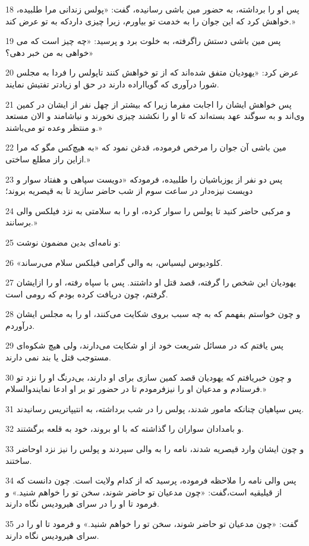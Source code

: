 \par 18 پس او را برداشته، به حضور مین باشی رسانیده، گفت: «پولس زندانی مرا طلبیده، خواهش کرد که این جوان را به خدمت تو بیاورم، زیرا چیزی داردکه به تو عرض کند.»
\par 19 پس مین باشی دستش راگرفته، به خلوت برد و پرسید: «چه چیز است که می خواهی به من خبر دهی؟»
\par 20 عرض کرد: «یهودیان متفق شده‌اند که از تو خواهش کنند تاپولس را فردا به مجلس شورا درآوری که گویااراده دارند در حق او زیادتر تفتیش نمایند.
\par 21 پس خواهش ایشان را اجابت مفرما زیرا که بیشتر از چهل نفر از ایشان در کمین وی‌اند و به سوگند عهد بسته‌اند که تا او را نکشند چیزی نخورند و نیاشامند و الان مستعد و منتظر وعده تو می‌باشند.»
\par 22 مین باشی آن جوان را مرخص فرموده، قدغن نمود که «به هیچ‌کس مگو که مرا ازاین راز مطلع ساختی.»
\par 23 پس دو نفر از یوزباشیان را طلبیده، فرمودکه «دویست سپاهی و هفتاد سوار و دویست نیزه‌دار در ساعت سوم از شب حاضر سازید تا به قیصریه بروند؛
\par 24 و مرکبی حاضر کنید تا پولس را سوار کرده، او را به سلامتی به نزد فیلکس والی برسانند.»
\par 25 و نامه‌ای بدین مضمون نوشت:
\par 26 «کلودیوس لیسیاس، به والی گرامی فیلکس سلام می‌رساند.
\par 27 یهودیان این شخص را گرفته، قصد قتل او داشتند. پس با سپاه رفته، او را ازایشان گرفتم، چون دریافت کرده بودم که رومی است.
\par 28 و چون خواستم بفهمم که به چه سبب بروی شکایت می‌کنند، او را به مجلس ایشان درآوردم.
\par 29 پس یافتم که در مسائل شریعت خود از او شکایت می‌دارند، ولی هیچ شکوه‌ای مستوجب قتل یا بند نمی دارند.
\par 30 و چون خبریافتم که یهودیان قصد کمین سازی برای او دارند، بی‌درنگ او را نزد تو فرستادم و مدعیان او را نیزفرمودم تا در حضور تو بر او ادعا نمایندوالسلام.»
\par 31 پس سپاهیان چنانکه مامور شدند، پولس را در شب برداشته، به انتیپاتریس رسانیدند.
\par 32 و بامدادان سواران را گذاشته که با او بروند، خود به قلعه برگشتند.
\par 33 و چون ایشان وارد قیصریه شدند، نامه را به والی سپردند و پولس را نیز نزد اوحاضر ساختند.
\par 34 پس والی نامه را ملاحظه فرموده، پرسید که از کدام ولایت است. چون دانست که از قیلیقیه است،گفت: «چون مدعیان تو حاضر شوند، سخن تو را خواهم شنید.» و فرمود تا او را در سرای هیرودیس نگاه دارند.
\par 35 گفت: «چون مدعیان تو حاضر شوند، سخن تو را خواهم شنید.» و فرمود تا او را در سرای هیرودیس نگاه دارند.

